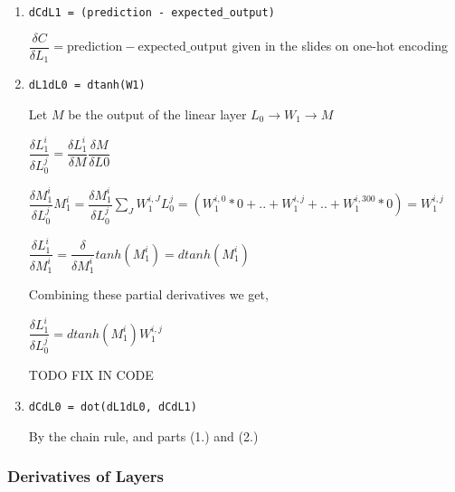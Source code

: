 \documentclass[]{article}
\begin{document}
\begin{enumerate}
	\def\labelenumi{\arabic{enumi}.}
	\item
	      \begin{verbatim}
dCdL1 = (prediction - expected_output)
	\end{verbatim}
	
	\(\dfrac{\delta C}{\delta L_1} = \text{prediction} - \text{expected\_output}\)
	given in the slides on one-hot encoding
	\item
	      \begin{verbatim}
dL1dL0 = dtanh(W1)
	\end{verbatim}
	
	Let \(M\) be the output of the linear layer
	\(L_0 \rightarrow W_1 \rightarrow M\)
	
	\(\dfrac{\delta L_1^i}{\delta L_0^j} =  \dfrac{\delta L_1^i}{\delta M}  \dfrac{\delta M}{\delta L0}\)
	
	\(\dfrac{\delta M_1^i}{\delta L_0^j} M_1^i =  \dfrac{\delta M_1^i}{\delta L_0^j} \sum_{J} W_1^{i,J} L_0^j =  (W_1^{i,0} * 0 + .. + W_1^{i,j} + .. + W_1^{i,300} * 0) =  W_1^{i,j}\)
	
	\(\dfrac{\delta L_1^i}{\delta M_1^i} =  \dfrac{\delta}{\delta M_1^i} tanh(M_1^i) = dtanh(M_1^i)\)
	
	Combining these partial derivatives we get,
	
	\(\dfrac{\delta L_1^i}{\delta L_0^j} =  dtanh(M_1^i) W_1^{i,j}\)
	
	TODO FIX IN CODE
	\item
	      \begin{verbatim}
dCdL0 = dot(dL1dL0, dCdL1)
	\end{verbatim}
	
	By the chain rule, and parts (1.) and (2.)
\end{enumerate}

\subsubsection{Derivatives of Layers}\label{derivatives-of-layers}
\end{document}
